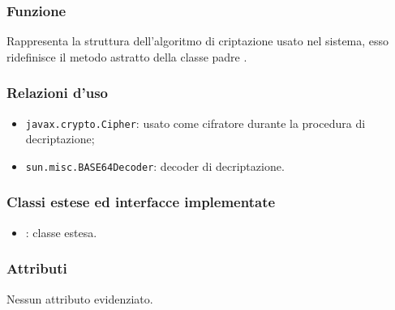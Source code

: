 
\subsubsection*{Funzione}
Rappresenta la struttura dell'algoritmo di criptazione usato nel sistema, esso ridefinisce il metodo astratto  della classe padre .

\subsubsection*{Relazioni d'uso}
\begin{itemize}
	\item \texttt{javax.crypto.Cipher}: usato come cifratore durante la procedura di decriptazione;
	\item \texttt{sun.misc.BASE64Decoder}: decoder di decriptazione.
\end{itemize}

\subsubsection*{Classi estese ed interfacce implementate}

\begin{itemize}
	\item {}: classe estesa.
\end{itemize}

\subsubsection*{Attributi}

Nessun attributo evidenziato.

